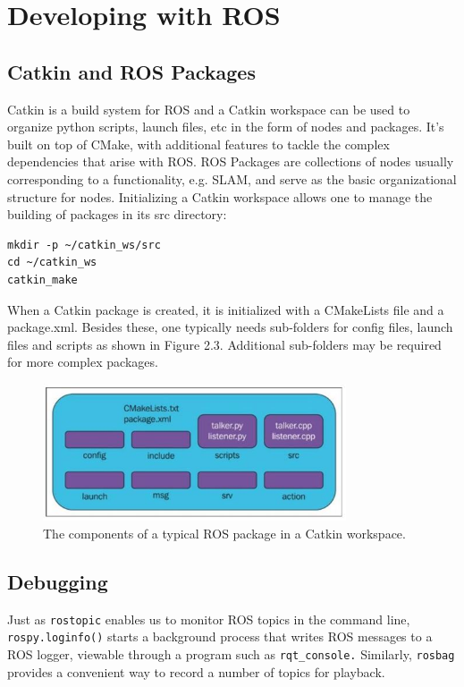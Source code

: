 \documentclass[twoside]{article}
\begin{document}
\section{Developing with ROS}
\subsection{Catkin and ROS Packages}
Catkin is a build system for ROS and a Catkin workspace can be used to organize python scripts, launch files, etc in the form of nodes and packages. It's built on top of CMake, with additional features to tackle the complex dependencies that arise with ROS. ROS Packages are collections of nodes usually corresponding to a functionality, e.g. SLAM, and serve as the basic organizational structure for nodes.
Initializing a Catkin workspace allows one to manage the building of packages in its src directory:

\begin{verbatim}
mkdir -p ~/catkin_ws/src
cd ~/catkin_ws
catkin_make
\end{verbatim}

When a Catkin package is created, it is initialized with a CMakeLists file and a package.xml. Besides these, one typically needs sub-folders for config files, launch files and scripts as shown in Figure 2.3. Additional sub-folders may be required for more complex packages.
\begin{figure}[ht]
\centering
\includegraphics[width=0.8\textwidth]{ROSPackage}
\caption{The components of a typical ROS package in a Catkin workspace.}
\end{figure}

\subsection{Debugging}
Just as \verb|rostopic| enables us to monitor ROS topics in the command line, \verb|rospy.loginfo()| starts a background process that writes ROS messages to a ROS logger, viewable through a program such as \verb|rqt_console.|
Similarly, \verb|rosbag| provides a convenient way to record a number of topics for playback.
\end{document}
